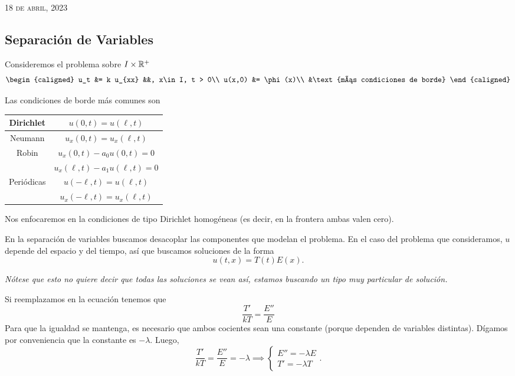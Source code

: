 \documentclass[../edp.tex]{subfiles}
\begin{document}
{\scshape \hfill 18 de abril, 2023}

\subsection{Separación de Variables}

Consideremos el problema sobre \(I \times \mathbb{R}^{+}\)
\begin{displaymath}
\begin{caligned}
	u_t &= k u_{xx} &&, x\in I, t > 0\\
	u(x,0) &= \phi(x)\\
	&\text{más condiciones de borde}
\end{caligned}
\end{displaymath}

Las condiciones de borde más comunes son
\begin{table}[h!]
\centering
\begin{tabular}{|c|c|}
	\hline
	Dirichlet & \(u(0,t) = u(\ell,t)\) \\
	\hline
	Neumann   & \(u_{x}(0,t) = u_{x}(\ell, t)\) \\
	\hline
	Robin	  & \(u_{x}(0,t) - a_0 u(0,t) = 0\) \\
			  & \(u_{x}(\ell,t) - a_1 u(\ell,t) = 0\) \\
	\hline
	Periódicas	& \(u(-\ell, t) = u(\ell, t)\) \\
				& \(u_{x}(-\ell, t) = u_{x}(\ell,t)\) \\
	\hline
\end{tabular}
\end{table}

Nos enfocaremos en la condiciones de tipo Dirichlet homogéneas (es
decir, en la frontera ambas valen cero).

En la separación de variables buscamos desacoplar las componentes que
modelan el problema. En el caso del problema que consideramos, \(u\)
depende del espacio y del tiempo, así que buscamos soluciones de la
forma
\begin{displaymath}
	u(t,x) = T(t) E(x).
\end{displaymath}

\textit{
Nótese que esto no quiere decir que todas las soluciones se vean así,
estamos buscando un tipo muy particular de solución.}

Si reemplazamos en la ecuación tenemos que
\begin{displaymath}
	\frac{T'}{k T}
	=
	\frac{E''}{E}
\end{displaymath}
Para que la igualdad se mantenga, es necesario que ambos cocientes
sean una constante (porque dependen de variables distintas). Dígamos
por conveniencia que la constante es \(-\lambda\). Luego,
\begin{displaymath}
	\frac{T'}{k T}
	=
	\frac{E''}{E}
	=
	-\lambda
	\implies
	\begin{cases}
		E'' = -\lambda E \\
		T' = -\lambda T
	\end{cases}.
\end{displaymath}
\end{document}
